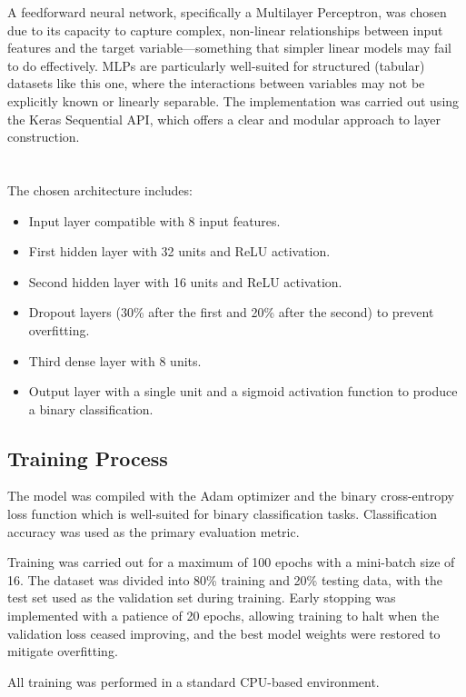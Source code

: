 A feedforward neural network, specifically a Multilayer Perceptron, was chosen due to its capacity to capture complex, non-linear relationships between input features and the target variable—something that simpler linear models may fail to do effectively. MLPs are particularly well-suited for structured (tabular) datasets like this one, where the interactions between variables may not be explicitly known or linearly separable. The implementation was carried out using the Keras Sequential API, which offers a clear and modular approach to layer construction.
\\\\\\
The chosen architecture includes:
\begin{itemize}
    \item Input layer compatible with 8 input features.
    \item First hidden layer with 32 units and ReLU activation.
    \item Second hidden layer with 16 units and ReLU activation.
    \item Dropout layers (30\% after the first and 20\% after the second) to prevent overfitting.
    \item Third dense layer with 8 units.
    \item Output layer with a single unit and a sigmoid activation function to produce a binary classification.
\end{itemize}


\subsection{Training Process}

The model was compiled with the Adam optimizer and the binary cross-entropy loss function which is well-suited for binary classification tasks. Classification accuracy was used as the primary evaluation metric.

Training was carried out for a maximum of 100 epochs with a mini-batch size of 16. The dataset was divided into 80\% training and 20\% testing data, with the test set used as the validation set during training. Early stopping was implemented with a patience of 20 epochs, allowing training to halt when the validation loss ceased improving, and the best model weights were restored to mitigate overfitting.

All training was performed in a standard CPU-based environment.


